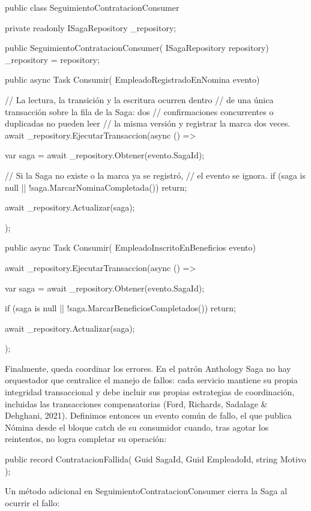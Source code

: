 \documentclass[12pt, a4paper]{article}
\begin{document}
    \begin{csharpbox}
public class SeguimientoContratacionConsumer
{
    private readonly ISagaRepository _repository;

    public SeguimientoContratacionConsumer(
        ISagaRepository repository)
    {
        _repository = repository;
    }

    public async Task Consumir(
        EmpleadoRegistradoEnNomina evento)
    {
        // La lectura, la transición y la escritura ocurren dentro
        // de una única transacción sobre la fila de la Saga: dos
        // confirmaciones concurrentes o duplicadas no pueden leer
        // la misma versión y registrar la marca dos veces.
        await _repository.EjecutarTransaccion(async () =>
        {
            var saga = await _repository.Obtener(evento.SagaId);

            // Si la Saga no existe o la marca ya se registró,
            // el evento se ignora.
            if (saga is null || !saga.MarcarNominaCompletada())
                return;

            await _repository.Actualizar(saga);
        });
    }

    public async Task Consumir(
        EmpleadoInscritoEnBeneficios evento)
    {
        await _repository.EjecutarTransaccion(async () =>
        {
            var saga = await _repository.Obtener(evento.SagaId);

            if (saga is null || !saga.MarcarBeneficiosCompletados())
                return;

            await _repository.Actualizar(saga);
        });
    }
}
    \end{csharpbox}

    Finalmente, queda coordinar los errores. En el patrón Anthology Saga no hay orquestador que centralice el manejo de fallos: cada servicio mantiene su propia integridad transaccional y debe incluir sus propias estrategias de coordinación, incluidas las transacciones compensatorias (Ford, Richards, Sadalage \& Dehghani, 2021). Definimos entonces un evento común de fallo, el que publica Nómina desde el bloque catch de su consumidor cuando, tras agotar los reintentos, no logra completar su operación:

    \begin{csharpbox}
public record ContratacionFallida(
    Guid SagaId,
    Guid EmpleadoId,
    string Motivo
);
    \end{csharpbox}

    Un método adicional en SeguimientoContratacionConsumer cierra la Saga al ocurrir el fallo:
\end{document}
